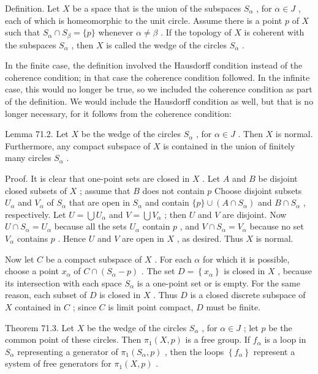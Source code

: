 Definition. Let \(X\) be a space that is the union of the subspaces \({S}_{\alpha }\) , for \(\alpha  \in  J\) , each of which is homeomorphic to the unit circle. Assume there is a point \(p\) of \(X\) such that \({S}_{\alpha } \cap  {S}_{\beta } = \{ p\}\) whenever \(\alpha  \neq  \beta\) . If the topology of \(X\) is coherent with the subspaces \({S}_{\alpha }\) , then \(X\) is called the wedge of the circles \({S}_{\alpha }\) .

In the finite case, the definition involved the Hausdorff condition instead of the coherence condition; in that case the coherence condition followed. In the infinite case, this would no longer be true, so we included the coherence condition as part of the definition. We would include the Hausdorff condition as well, but that is no longer necessary, for it follows from the coherence condition:

Lemma 71.2. Let \(X\) be the wedge of the circles \({S}_{\alpha }\) , for \(\alpha  \in  J\) . Then \(X\) is normal. Furthermore, any compact subspace of \(X\) is contained in the union of finitely many circles \({S}_{\alpha }\) .

Proof. It is clear that one-point sets are closed in \(X\) . Let \(A\) and \(B\) be disjoint closed subsets of \(X\) ; assume that \(B\) does not contain \(p\) Choose disjoint subsets \({U}_{\alpha }\) and \({V}_{\alpha }\) of \({S}_{\alpha }\) that are open in \({S}_{\alpha }\) and contain \(\{ p\}  \cup  \left( {A \cap  {S}_{\alpha }}\right)\) and \(B \cap  {S}_{\alpha }\) , respectively. Let \(U = \bigcup {U}_{\alpha }\) and \(V = \bigcup {V}_{\alpha }\) ; then \(U\) and \(V\) are disjoint. Now \(U \cap  {S}_{\alpha } = {U}_{\alpha }\) because all the sets \({U}_{\alpha }\) contain \(p\) , and \(V \cap  {S}_{\alpha } = {V}_{\alpha }\) because no set \({V}_{\alpha }\) contains \(p\) . Hence \(U\) and \(V\) are open in \(X\) , as desired. Thus \(X\) is normal.

Now let \(C\) be a compact subspace of \(X\) . For each \(\alpha\) for which it is possible, choose a point \({x}_{\alpha }\) of \(C \cap  \left( {{S}_{\alpha } - p}\right)\) . The set \(D = \left\{  {x}_{\alpha }\right\}\) is closed in \(X\) , because its intersection with each space \({S}_{\alpha }\) is a one-point set or is empty. For the same reason, each subset of \(D\) is closed in \(X\) . Thus \(D\) is a closed discrete subspace of \(X\) contained in \(C\) ; since \(C\) is limit point compact, \(D\) must be finite.

Theorem 71.3. Let \(X\) be the wedge of the circles \({S}_{\alpha }\) , for \(\alpha  \in  J\) ; let \(p\) be the common point of these circles. Then \({\pi }_{1}\left( {X,p}\right)\) is a free group. If \({f}_{\alpha }\) is a loop in \({S}_{\alpha }\) representing a generator of \({\pi }_{1}\left( {{S}_{\alpha },p}\right)\) , then the loops \(\left\{  {f}_{\alpha }\right\}\) represent a system of free generators for \({\pi }_{1}\left( {X,p}\right)\) .

